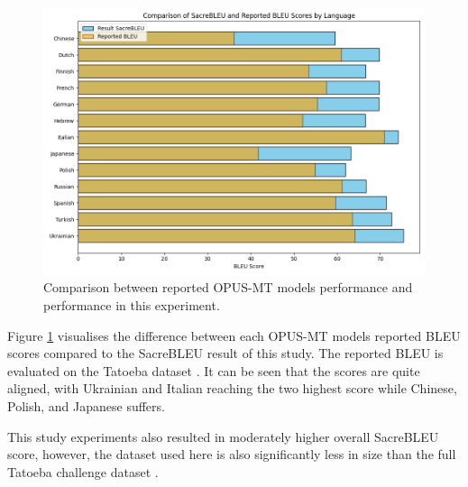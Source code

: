 \documentclass[a4paper]{article}
\begin{document}
\begin{figure}[htbp]
    \centering
    \includegraphics[width=0.8\linewidth]{figures/opus_bleu_comparison.png}
    \caption{Comparison between reported OPUS-MT models performance and performance in this experiment.}
    \label{fig:opus_comparison}
\end{figure}

Figure \ref{fig:opus_comparison} visualises the difference between each OPUS-MT models reported BLEU scores compared to the SacreBLEU result of this study. The reported BLEU is evaluated on the Tatoeba dataset \cite{tiedemann-2020-opus-mt}. It can be seen that the scores are quite aligned, with Ukrainian and Italian reaching the two highest score while Chinese, Polish, and Japanese suffers.

This study experiments also resulted in moderately higher overall SacreBLEU score, however, the dataset used here is also significantly less in size than the full Tatoeba challenge dataset \cite{tiedemann-2020-tatoeba-challenge}.
\end{document}
